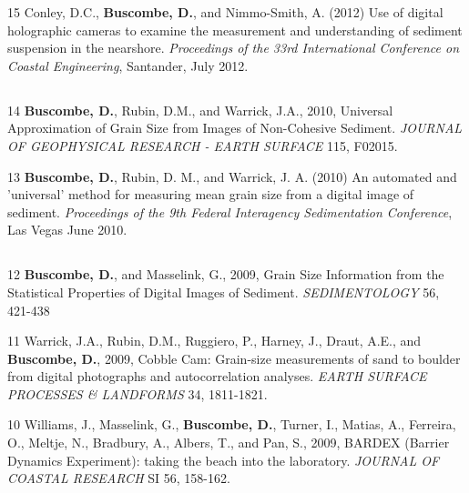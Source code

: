 \documentclass[margin,line]{resume}
\begin{document}
\begin{resume}
\begin{footnotesize}
\begin{list1}
	\item[15] Conley, D.C., {\bf Buscombe, D.}, and Nimmo-Smith, A. (2012) Use of digital holographic cameras to examine the measurement and understanding of sediment suspension in the nearshore. {\sl Proceedings of the 33rd International Conference on Coastal Engineering}, Santander, July 2012.

	\end{list1}

	\subsection{}
	\begin{list1}
	\item[14] {\bf Buscombe, D.}, Rubin, D.M., and Warrick, J.A., 2010, Universal Approximation of Grain Size from Images of Non-Cohesive Sediment. {\sl JOURNAL OF GEOPHYSICAL RESEARCH - EARTH SURFACE} 115, F02015.\\

	\item[13] {\bf Buscombe, D.}, Rubin, D. M., and Warrick, J. A. (2010) An automated and 'universal' method for measuring mean grain size from a digital image of sediment. {\sl Proceedings of the 9th Federal Interagency Sedimentation Conference}, Las Vegas June 2010.

	\end{list1}
	
	\subsection{}
	\begin{list1}
	\item[12] {\bf Buscombe, D.}, and Masselink, G., 2009, Grain Size Information from the Statistical Properties of Digital Images of Sediment. {\sl SEDIMENTOLOGY} 56, 421-438 \\

	\item[11] Warrick, J.A., Rubin, D.M., Ruggiero, P., Harney, J., Draut, A.E., and {\bf Buscombe, D.}, 2009, Cobble Cam: Grain-size measurements of sand to boulder from digital photographs and autocorrelation analyses. {\sl EARTH SURFACE PROCESSES \& LANDFORMS} 34, 1811-1821.\\

	\item[10] Williams, J., Masselink, G., {\bf Buscombe, D.}, Turner, I., Matias, A., Ferreira, O., Meltje, N., Bradbury, A., Albers, T., and Pan, S., 2009, BARDEX (Barrier Dynamics Experiment): taking the beach into the laboratory. {\sl JOURNAL OF COASTAL RESEARCH} SI 56, 158-162.
	\end{list1}
	

\end{footnotesize}
\end{resume}
\end{document}
